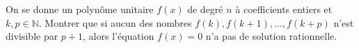 On se donne un polynôme unitaire $f(x)$ de degré $n$ à coefficients entiers et $k, p \in \mathbb{N}$. Montrer que si aucun des nombres $f(k), f(k + 1), \ldots, f(k + p)$ n'est divisible par $p + 1$, alors l'équation $f(x) = 0$ n'a pas de solution rationnelle.
